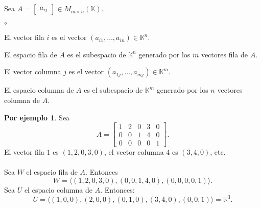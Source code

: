 \documentclass{article}
\theoremstyle{definition}
\theoremstyle{definition}
\newtheorem*{ej}{Por ejemplo}
\theoremstyle{remark}
\begin{document}
\begin{defi} \; \\\\
  Sea $A=\begin{bmatrix}a_{ij}\end{bmatrix}\in M_{m \times n}(\mathbb{K})$.\begin{list}{$\circ$}{}  
\item El vector fila $i$ es el vector $(a_{i1},\dots ,a_{in})\in \mathbb{K}^n$.
\item El espacio fila de $A$ es el subespacio de $\mathbb{K}^n$ generado por los $m$ vectores fila de $A$.
\item El vector columna $j$ es el vector $(a_{1j}, \dots ,a_{mj}) \in \mathbb{K}^m$.
\item El espacio columna de $A$ es el subespacio de $\mathbb{K}^m$ generado por los $n$ vectores columna de $A$.
\end{list}
\end{defi}
\begin{ej}
 Sea \[
   A=\begin{bmatrix}1 & 2 & 0 & 3 & 0 \\ 0 & 0 & 1 & 4 & 0 \\ 0 & 0 & 0 & 0 & 1 \end{bmatrix}. 
 \]
 El vector fila $1$ es $(1,2,0,3,0)$, el vector columna $4$ es $(3,4,0)$, etc. \\\\ Sea $W$ el espacio fila de $A$. Entonces \[
W=\langle (1,2,0,3,0),(0,0,1,4,0),(0,0,0,0,1)\rangle.
 \]
 Sea $U$ el espacio columna de $A$. Entonces: \[
   U=\langle (1,0,0),(2,0,0),(0,1,0),(3,4,0),(0,0,1) \rangle = \mathbb{R}^3.
 \]
\end{ej} \pagebreak
\end{document}
